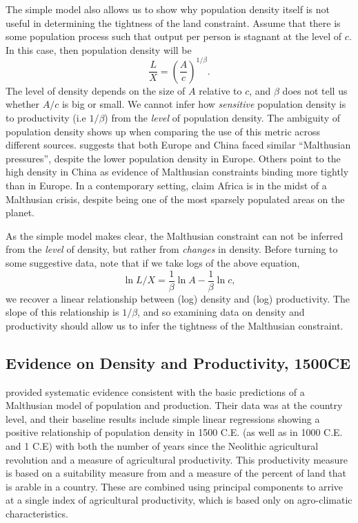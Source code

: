 \documentclass[11pt]{article}
\begin{document}
The simple model also allows us to show why population density itself is not useful in determining the tightness of the land constraint. Assume that there is some population process such that output per person is stagnant at the level of $c$. In this case, then population density will be
\begin{equation}
    \frac{L}{X} = \left(\frac{A}{c}\right)^{1/\beta}.
\end{equation}
The level of density depends on the size of $A$ relative to $c$, and $\beta$ does not tell us whether $A/c$ is big or small. We cannot infer how \textit{sensitive} population density is to productivity (i.e $1/\beta$) from the \textit{level} of population density. The ambiguity of population density shows up when comparing the use of this metric across different sources. \citet{pom2000} suggests that both Europe and China faced similar ``Malthusian pressures'', despite the lower population density in Europe. Others \citep{Elvin1973,huang2002} point to the high density in China as evidence of Malthusian constraints binding more tightly than in Europe. In a contemporary setting, \citet{conleyetal2007} claim Africa is in the midst of a Malthusian crisis, despite being one of the most sparsely populated areas on the planet. 

As the simple model makes clear, the Malthusian constraint can not be inferred from the \textit{level} of density, but rather from \textit{changes} in density. Before turning to some suggestive data, note that if we take logs of the above equation,
\begin{equation}
	\ln L/X = \frac{1}{\beta} \ln A - \frac{1}{\beta} \ln c, \label{EQ_LX}
\end{equation}
we recover a linear relationship between (log) density and (log) productivity. The slope of this relationship is $1/\beta$, and so examining data on density and productivity should allow us to infer the tightness of the Malthusian constraint.

\subsection{Evidence on Density and Productivity, 1500CE}
\citet{ashraf2010dynamics} provided systematic evidence consistent with the basic predictions of a Malthusian model of population and production. Their data was at the country level, and their baseline results include simple linear regressions showing a positive relationship of population density in 1500 C.E. (as well as in 1000 C.E. and 1 C.E) with both the number of years since the Neolithic agricultural revolution and a measure of agricultural productivity. This productivity measure is based on a suitability measure from \citet{ramankutty2002} and a measure of the percent of land that is arable in a country. These are combined using principal components to arrive at a single index of agricultural productivity, which is based only on agro-climatic characteristics.
\end{document}
